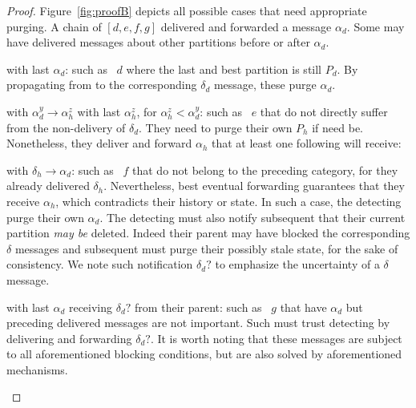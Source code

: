 \begin{proof}
  Figure~\ref{fig:proofB} depicts all possible cases that need
  appropriate purging. A chain of \processes $[d, e, f, g]$ delivered
  and forwarded a message $\alpha_d$. Some \processes may have
  delivered messages about other partitions before or after
  $\alpha_d$.
  \begin{asparadesc}
  \item [\processes with last $\alpha_d$:] \Processes such as
    \Process~$d$ where the last and best partition is still $P_d$. By
    propagating from \process to \process the corresponding $\delta_d$
    message, these \processes purge $\alpha_d$.
  \item [\processes with $\alpha_d^y \rightarrow \alpha_h^z$ with last
    $\alpha_h^z$, for $\alpha_h^z < \alpha_d^y$:] \Processes such as
    \Process~$e$ that do not directly suffer from the non-delivery of
    $\delta_d$. They need to purge their own $P_h$ if need
    be. Nonetheless, they deliver and forward $\alpha_h$ that at least
    one following \process will receive:
  \item [\processes with $\delta_h \rightarrow \alpha_d$:] \Processes
    such as \Process~$f$ that do not belong to the preceding category,
    for they already delivered $\delta_h$. Nevertheless, best eventual
    forwarding guarantees that they receive $\alpha_h$, which
    contradicts their history or state. In such a case, the detecting
    \processes purge their own $\alpha_d$. The detecting \processes
    must also notify subsequent \processes that their current
    partition \emph{may be} deleted. Indeed their parent may have
    blocked the corresponding $\delta$ messages and subsequent
    \processes must purge their possibly stale state, for the sake of
    consistency.  We note such notification $\delta_d?$ to emphasize
    the uncertainty of a $\delta$ message.
  \item [\processes with last $\alpha_d$ receiving $\delta_d?$ from
    their parent:] \Processes such as \Process~$g$ that have
    $\alpha_d$ but preceding delivered messages are not
    important. Such \processes must trust detecting \processes by
    delivering and forwarding $\delta_d?$. It is worth noting that
    these messages are subject to all aforementioned blocking
    conditions, but are also solved by aforementioned mechanisms.
  \end{asparadesc}


\end{proof}

